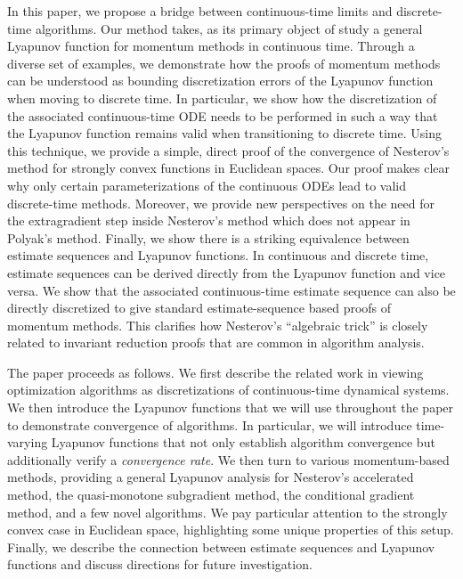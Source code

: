\documentclass[11pt]{article}
\theoremstyle{plain}
\begin{document}
In this paper, we propose a bridge between continuous-time limits and discrete-time algorithms.  Our method takes, as its primary object of study a general Lyapunov function for momentum methods in continuous time.  Through a diverse set of examples, we demonstrate how the proofs of momentum methods can be understood as bounding discretization errors of the Lyapunov function when moving to discrete time.  In particular, we show how the discretization of the associated continuous-time ODE needs to be performed in such a way that the Lyapunov function remains valid when transitioning to discrete time.
Using this technique, we provide a simple, direct proof of the convergence of Nesterov's method for strongly convex functions in Euclidean spaces.  Our proof makes clear why only certain parameterizations of the continuous ODEs lead to valid discrete-time methods.  Moreover, we provide new perspectives on the need for the extragradient step inside Nesterov's method which does not appear in Polyak's method.  
Finally, we show there is a striking equivalence between estimate sequences and Lyapunov functions.  In continuous and discrete time, estimate sequences can be derived directly from the Lyapunov function and vice versa.  We show that the associated continuous-time estimate sequence can also be directly discretized to give standard estimate-sequence based proofs of momentum methods.  This clarifies how Nesterov's ``algebraic trick'' is closely related to invariant reduction proofs that are common in algorithm analysis.

The paper proceeds as follows.  We first describe the related work in viewing optimization algorithms as discretizations of continuous-time dynamical systems.  We then introduce the Lyapunov functions that we will use throughout the paper to demonstrate convergence of algorithms.  In particular, we will introduce time-varying Lyapunov functions that not only establish algorithm convergence but additionally verify a \emph{convergence rate}.  
 We then turn to various momentum-based methods, providing a general Lyapunov analysis for Nesterov's accelerated method, the quasi-monotone subgradient method, the conditional gradient method, and a few novel algorithms.  We pay particular attention to the strongly convex case in Euclidean space, highlighting some unique properties of this setup.  Finally, we describe the connection between estimate sequences and Lyapunov functions and discuss directions for future investigation.
 
\end{document}
